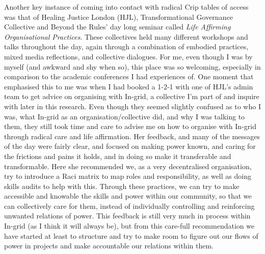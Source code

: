 Another key instance of coming into contact with radical Crip tables of
access was that of Healing Justice London (HJL), Transformational
Governance Collective and Beyond the Rules' day long seminar called
\emph{Life Affirming Organisational Practices}. These collectives held
many different workshops and talks throughout the day, again through a
combination of embodied practices, mixed media reflections, and
collective dialogues. For me, even though I was by myself (and awkward
and shy when so), this place was so welcoming, especially in comparison
to the academic conferences I had experiences of. One moment that
emphasised this to me was when I had booked a 1-2-1 with one of HJL's
admin team to get advice on organising with In-grid, a collective I'm
part of and inquire with later in this research. Even though they seemed
slightly confused as to who I was, what In-grid as an
organisation/collective did, and why I was talking to them, they still
took time and care to advise me on how to organise with In-grid through
radical care and life affirmation. Her feedback, and many of the
messages of the day were fairly clear, and focused on making power
known, and caring for the frictions and pains it holds, and in doing so
make it transferable and transformable. Here she recommended we, as a
very decentralised organisation, try to introduce a Raci matrix to map
roles and responsibility, as well as doing skills audits to help with
this. Through these practices, we can try to make accessible and
knowable the skills and power within our community, so that we can
collectively care for them, instead of individually controlling and
reinforcing unwanted relations of power. This feedback is still very
much in process within In-grid (as I think it will always be), but from
this care-full recommendation we have started at least to structure and
try to make room to figure out our flows of power in projects and make
accountable our relations within them.

